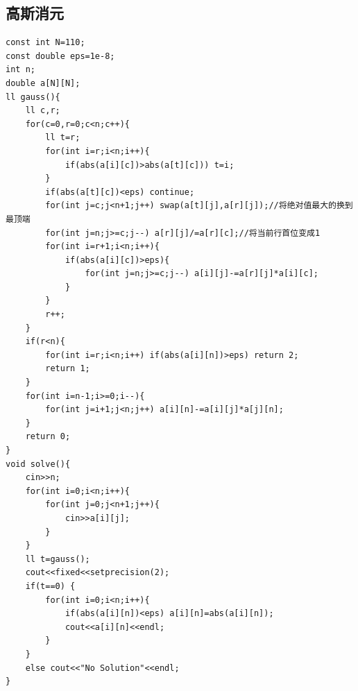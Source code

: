 \documentclass[11pt,a4paper,twocolumn]{ctexart}  %
\begin{document}
\subsection{高斯消元}
\begin{lstlisting}[caption={高斯消元},label={高斯消元}]
const int N=110;
const double eps=1e-8;
int n;
double a[N][N];
ll gauss(){
    ll c,r;
    for(c=0,r=0;c<n;c++){
        ll t=r;
        for(int i=r;i<n;i++){
            if(abs(a[i][c])>abs(a[t][c])) t=i;
        }
        if(abs(a[t][c])<eps) continue;
        for(int j=c;j<n+1;j++) swap(a[t][j],a[r][j]);//将绝对值最大的换到最顶端
        for(int j=n;j>=c;j--) a[r][j]/=a[r][c];//将当前行首位变成1
        for(int i=r+1;i<n;i++){
            if(abs(a[i][c])>eps){
                for(int j=n;j>=c;j--) a[i][j]-=a[r][j]*a[i][c];
            }
        }
        r++;
    }
    if(r<n){
        for(int i=r;i<n;i++) if(abs(a[i][n])>eps) return 2;
        return 1;
    }
    for(int i=n-1;i>=0;i--){
        for(int j=i+1;j<n;j++) a[i][n]-=a[i][j]*a[j][n];
    }
    return 0;
}
void solve(){
    cin>>n;
    for(int i=0;i<n;i++){
        for(int j=0;j<n+1;j++){
            cin>>a[i][j];
        }
    }
    ll t=gauss();
    cout<<fixed<<setprecision(2);
    if(t==0) {
        for(int i=0;i<n;i++){
            if(abs(a[i][n])<eps) a[i][n]=abs(a[i][n]);
            cout<<a[i][n]<<endl;
        }
    }
    else cout<<"No Solution"<<endl;
}
\end{lstlisting}
\end{document}
